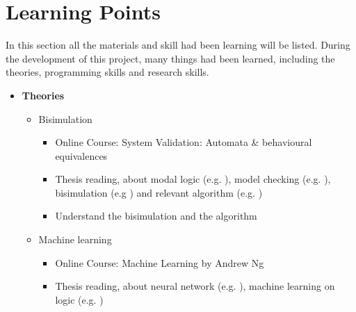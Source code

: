 \section{Learning Points}
\label{sec:learning}
In this section all the materials and skill had been learning will be listed.
During the development of this project, many things had been learned, including the theories, programming skills and research skills.
\begin{itemize}
    \item \textbf{Theories}
    \begin{itemize}
        \item Bisimulation 
        \begin{itemize}
            \item Online Course: System Validation: Automata \& behavioural equivalences \cite{Groote2016}
            \item Thesis reading, about modal logic (e.g. \cite{VanBenthem1976,Blackburn2001a}), model checking (e.g. \cite{Roscoe1994}), bisimulation (e.g \cite{Glabbeek2011, Stirling2011a, Larsen1991}) and relevant algorithm (e.g. \cite{Paige1987, Dovier2004})
            \item Understand the bisimulation and the algorithm
        \end{itemize}
        
        \item Machine learning
        \begin{itemize}
            \item Online Course: Machine Learning by Andrew Ng \cite{Ng2015}
            \item Thesis reading, about neural network (e.g. \cite{Dayhoff1990}), machine learning on logic (e.g. \cite{holldobler1999approximating, Leshno2013})
        \end{itemize}
        
    \end{itemize}
    

\end{itemize}
